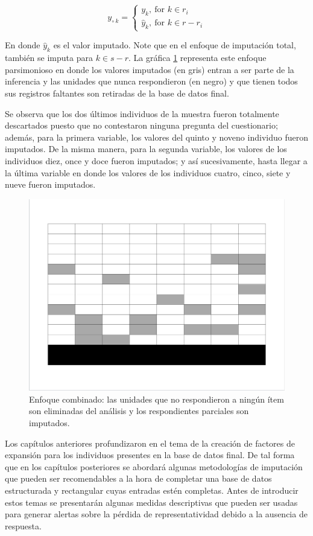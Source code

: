 \documentclass[
  12pt,
]{book}
\begin{document}
\[
y_{\circ \  k} = 
\begin{cases}
y_k, \ \text{for $k \in r_i$} \\
\hat{y}_k, \ \text{for $k \in r - r_i$}
\end{cases}
\]

En donde \(\hat{y}_k\) es el valor imputado. Note que en el enfoque de imputación total, también se imputa para \(k \in s-r\). La gráfica \ref{fig:figenfcomb} representa este enfoque parsimonioso en donde los valores imputados (en gris) entran a ser parte de la inferencia y las unidades que nunca respondieron (en negro) y que tienen todos sus registros faltantes son retiradas de la base de datos final.

Se observa que los dos últimos individuos de la muestra fueron totalmente descartados puesto que no contestaron ninguna pregunta del cuestionario; además, para la primera variable, los valores del quinto y noveno individuo fueron imputados. De la misma manera, para la segunda variable, los valores de los individuos diez, once y doce fueron imputados; y así sucesivamente, hasta llegar a la última variable en donde los valores de los individuos cuatro, cinco, siete y nueve fueron imputados.

\begin{figure}
\includegraphics[width=0.5\linewidth]{Pics/j5} \caption{Enfoque combinado: las unidades que no respondieron a ningún ítem son eliminadas del análisis y los respondientes parciales son imputados.}\label{fig:figenfcomb}
\end{figure}

Los capítulos anteriores profundizaron en el tema de la creación de factores de expansión para los individuos presentes en la base de datos final. De tal forma que en los capítulos posteriores se abordará algunas metodologías de imputación que pueden ser recomendables a la hora de completar una base de datos estructurada y rectangular cuyas entradas estén completas. Antes de introducir estos temas se presentarán algunas medidas descriptivas que pueden ser usadas para generar alertas sobre la pérdida de representatividad debido a la ausencia de respuesta.
\end{document}
